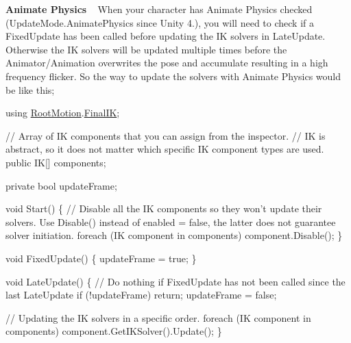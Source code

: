 {\bfseries Animate Physics} ~\newline
When your character has Animate Physics checked (Update\+Mode.\+Animate\+Physics since Unity 4.), you will need to check if a Fixed\+Update has been called before updating the IK solvers in Late\+Update. Otherwise the IK solvers will be updated multiple times before the Animator/\+Animation overwrites the pose and accumulate resulting in a high frequency flicker. So the way to update the solvers with Animate Physics would be like this;


\begin{DoxyCode}
\textcolor{keyword}{using} \mbox{\hyperlink{namespace_root_motion}{RootMotion}}.\mbox{\hyperlink{namespace_root_motion_1_1_final_i_k}{FinalIK}};

\textcolor{comment}{// Array of IK components that you can assign from the inspector. }
\textcolor{comment}{// IK is abstract, so it does not matter which specific IK component types are used.}
\textcolor{keyword}{public} IK[] components;

\textcolor{keyword}{private} \textcolor{keywordtype}{bool} updateFrame;
    
\textcolor{keywordtype}{void} Start() \{
    \textcolor{comment}{// Disable all the IK components so they won't update their solvers. Use Disable() instead of enabled =
       false, the latter does not guarantee solver initiation.}
    \textcolor{keywordflow}{foreach} (IK component \textcolor{keywordflow}{in} components) component.Disable();
\}

\textcolor{keywordtype}{void} FixedUpdate() \{
    updateFrame = \textcolor{keyword}{true};
\}

\textcolor{keywordtype}{void} LateUpdate() \{
    \textcolor{comment}{// Do nothing if FixedUpdate has not been called since the last LateUpdate}
    \textcolor{keywordflow}{if} (!updateFrame) \textcolor{keywordflow}{return};
    updateFrame = \textcolor{keyword}{false};
    
    \textcolor{comment}{// Updating the IK solvers in a specific order. }
    \textcolor{keywordflow}{foreach} (IK component \textcolor{keywordflow}{in} components) component.GetIKSolver().Update();
\}
\end{DoxyCode}
 